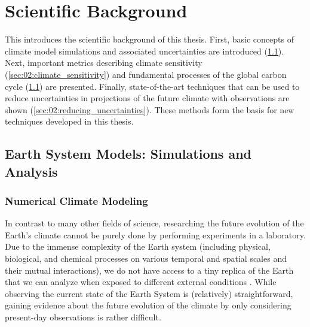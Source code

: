 
%



\chapter{Scientific Background}
\label{ch:02:scientific_background}

This  introduces the scientific
background of this thesis. First, basic concepts of climate model simulations
and associated uncertainties are introduced (\cref{sec:02:esms}). Next,
important metrics describing climate sensitivity
(\cref{sec:02:climate_sensitivity}) and fundamental processes of the global
carbon cycle (\cref{sec:02:esms}) are presented. Finally, state-of-the-art
techniques that can be used to reduce uncertainties in projections of the
future climate with observations are shown
(\cref{sec:02:reducing_uncertainties}). These methods form the basis for new
techniques developed in this thesis.


\section{Earth System Models: Simulations and Analysis}
\label{sec:02:esms}


\subsection{Numerical Climate Modeling}
\label{subsec:02:numerical_climate_modeling}

In contrast to many other fields of science, researching the future evolution
of the Earth's climate cannot be purely done by performing experiments in a
laboratory. Due to the immense complexity of the Earth system (including
physical, biological, and chemical processes on various temporal and spatial
scales and their mutual interactions), we do not have access to a tiny replica
of the Earth that we can analyze when exposed to different external conditions
\autocite{Flato2011}. While observing the current state of the Earth System is
(relatively) straightforward, gaining evidence about the future evolution of
the climate by only considering present-day observations is rather difficult.

